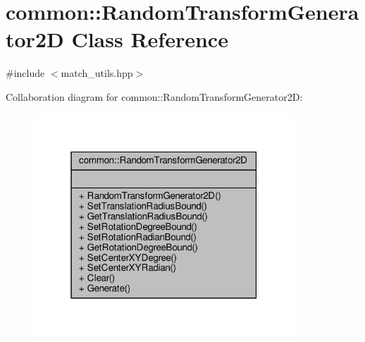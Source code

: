 \hypertarget{classcommon_1_1RandomTransformGenerator2D}{}\section{common\+:\+:Random\+Transform\+Generator2D Class Reference}
\label{classcommon_1_1RandomTransformGenerator2D}


{\ttfamily \#include $<$match\+\_\+utils.\+hpp$>$}



Collaboration diagram for common\+:\+:Random\+Transform\+Generator2D\+:\nopagebreak
\begin{figure}[H]
\begin{center}
\leavevmode
\includegraphics[width=277pt]{d2/de7/classcommon_1_1RandomTransformGenerator2D__coll__graph}
\end{center}
\end{figure}
